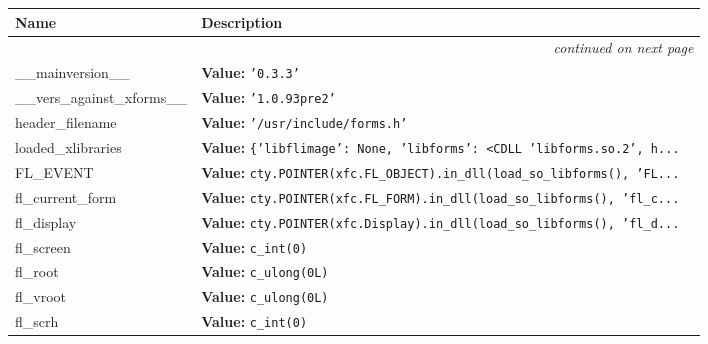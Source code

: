     \vspace{-1cm}
\hspace{\varindent}\begin{longtable}{|p{\varnamewidth}|p{\vardescrwidth}|l}
\cline{1-2}
\cline{1-2} \centering \textbf{Name} & \centering \textbf{Description}& \\
\cline{1-2}
\endhead\cline{1-2}\multicolumn{3}{r}{\small\textit{continued on next page}}\\\endfoot\cline{1-2}
\endlastfoot\raggedright \_\-\_\-m\-a\-i\-n\-v\-e\-r\-s\-i\-o\-n\-\_\-\_\- & \raggedright \textbf{Value:} 
{\tt \texttt{'}\texttt{0.3.3}\texttt{'}}&\\
\cline{1-2}
\raggedright \_\-\_\-v\-e\-r\-s\-\_\-a\-g\-a\-i\-n\-s\-t\-\_\-x\-f\-o\-r\-m\-s\-\_\-\_\- & \raggedright \textbf{Value:} 
{\tt \texttt{'}\texttt{1.0.93pre2}\texttt{'}}&\\
\cline{1-2}
\raggedright h\-e\-a\-d\-e\-r\-\_\-f\-i\-l\-e\-n\-a\-m\-e\- & \raggedright \textbf{Value:} 
{\tt \texttt{'}\texttt{/usr/include/forms.h}\texttt{'}}&\\
\cline{1-2}
\raggedright l\-o\-a\-d\-e\-d\-\_\-x\-l\-i\-b\-r\-a\-r\-i\-e\-s\- & \raggedright \textbf{Value:} 
{\tt \texttt{\{}\texttt{'}\texttt{libflimage}\texttt{'}\texttt{: }None\texttt{, }\texttt{'}\texttt{libforms}\texttt{'}\texttt{: }{\textless}CDLL 'libforms.so.2', h\texttt{...}}&\\
\cline{1-2}
\raggedright F\-L\-\_\-E\-V\-E\-N\-T\- & \raggedright \textbf{Value:} 
{\tt cty.POINTER(xfc.FL\_OBJECT).in\_dll(load\_so\_libforms(), 'FL\texttt{...}}&\\
\cline{1-2}
\raggedright f\-l\-\_\-c\-u\-r\-r\-e\-n\-t\-\_\-f\-o\-r\-m\- & \raggedright \textbf{Value:} 
{\tt cty.POINTER(xfc.FL\_FORM).in\_dll(load\_so\_libforms(), 'fl\_c\texttt{...}}&\\
\cline{1-2}
\raggedright f\-l\-\_\-d\-i\-s\-p\-l\-a\-y\- & \raggedright \textbf{Value:} 
{\tt cty.POINTER(xfc.Display).in\_dll(load\_so\_libforms(), 'fl\_d\texttt{...}}&\\
\cline{1-2}
\raggedright f\-l\-\_\-s\-c\-r\-e\-e\-n\- & \raggedright \textbf{Value:} 
{\tt c\_int(0)}&\\
\cline{1-2}
\raggedright f\-l\-\_\-r\-o\-o\-t\- & \raggedright \textbf{Value:} 
{\tt c\_ulong(0L)}&\\
\cline{1-2}
\raggedright f\-l\-\_\-v\-r\-o\-o\-t\- & \raggedright \textbf{Value:} 
{\tt c\_ulong(0L)}&\\
\cline{1-2}
\raggedright f\-l\-\_\-s\-c\-r\-h\- & \raggedright \textbf{Value:} 
{\tt c\_int(0)}&\\

\end{longtable}
